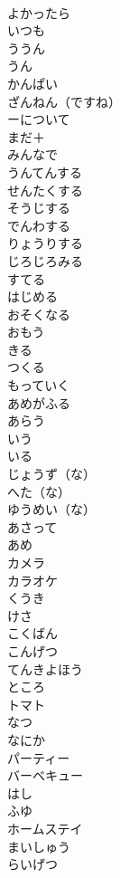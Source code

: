\documentclass[8pt]{extreport}
\begin{document}
\begin{CJK}{UTF8}{min}
\\	よかったら	
\\	いつも	
\\	ううん	
\\	うん	
\\	かんぱい	
\\	ざんねん（ですね）	
\\	ーについて	
\\	まだ＋
\\	みんなで	
\\	うんてんする	
\\	せんたくする	
\\	そうじする	
\\	でんわする	
\\	りょうりする	
\\	じろじろみる	
\\	すてる	
\\	はじめる	
\\	おそくなる	
\\	おもう	
\\	きる	
\\	つくる	
\\	もっていく	
\\	あめがふる	
\\	あらう	
\\	いう	
\\	いる	
\\	じょうず（な）	
\\	へた（な）	
\\	ゆうめい（な）	
\\	あさって	
\\	あめ	
\\	カメラ	
\\	カラオケ	
\\	くうき	
\\	けさ	
\\	こくばん	
\\	こんげつ	
\\	てんきよほう	
\\	ところ	
\\	トマト	
\\	なつ	
\\	なにか	
\\	パーティー	
\\	バーベキュー	
\\	はし	
\\	ふゆ	
\\	ホームステイ	
\\	まいしゅう	
\\	らいげつ	

\end{CJK}
\end{document}
